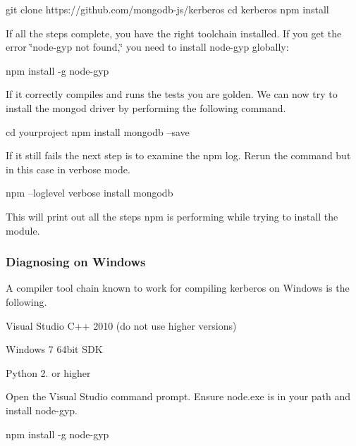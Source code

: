 \begin{DoxyCode}
git clone https://github.com/mongodb-js/kerberos
cd kerberos
npm install
\end{DoxyCode}


If all the steps complete, you have the right toolchain installed. If you get the error \char`\"{}node-\/gyp not found,\char`\"{} you need to install {\ttfamily node-\/gyp} globally\+:


\begin{DoxyCode}
npm install -g node-gyp
\end{DoxyCode}


If it correctly compiles and runs the tests you are golden. We can now try to install the {\ttfamily mongod} driver by performing the following command.


\begin{DoxyCode}
cd yourproject
npm install mongodb --save
\end{DoxyCode}


If it still fails the next step is to examine the npm log. Rerun the command but in this case in verbose mode.


\begin{DoxyCode}
npm --loglevel verbose install mongodb
\end{DoxyCode}


This will print out all the steps npm is performing while trying to install the module.

\subsubsection*{Diagnosing on Windows}

A compiler tool chain known to work for compiling {\ttfamily kerberos} on Windows is the following.


\begin{DoxyItemize}
\item Visual Studio C++ 2010 (do not use higher versions)
\item Windows 7 64bit S\+DK
\item Python 2. or higher
\end{DoxyItemize}

Open the Visual Studio command prompt. Ensure {\ttfamily node.\+exe} is in your path and install {\ttfamily node-\/gyp}.


\begin{DoxyCode}
npm install -g node-gyp
\end{DoxyCode}


